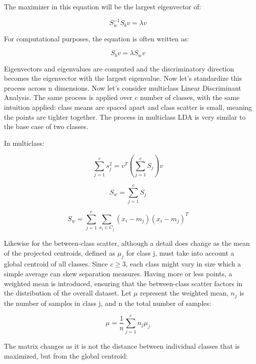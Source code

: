 \documentclass{article}
\begin{document}
The maximizer in this equation will be the largest eigenvector of:

\begin{equation*}
S_w^{-1} S_b v = \lambda v
\end{equation*}

For computational purposes, the equation is often written as:

\begin{equation*}
S_b v = \lambda S_w v
\end{equation*}

Eigenvectors and eigenvalues are computed and the discriminatory direction becomes the eigenvector with the largest eigenvalue. Now let's standardize this process across n dimensions. Now let's consider multiclass Linear Discriminant Analysis. The same process is applied over c number of classes, with the same intuition applied: class means are spaced apart and class scatter is small, meaning the points are tighter together. The process in multiclass LDA is very similar to the base case of two classes.

In multiclass:

\begin{equation*}
\sum_{j=1}^{c} s_j^2 = v^T \left(\sum_{j=1}^{c} S_j\right) v
\end{equation*}

\begin{equation*}
S_w = \sum_{j=1}^{c} S_j
\end{equation*}

\begin{equation*}
S_w = \sum_{j=1}^{c} \sum_{x_i \in C_j} (x_i - m_j)(x_i - m_j)^T
\end{equation*}

Likewise for the between-class scatter, although a detail does change as the mean of the projected centroids, defined as $\mu_j$ for class j, must take into account a global centroid of all classes. Since $c \geq 3$, each class might vary in size which a simple average can skew separation measures. Having more or less points, a weighted mean is introduced, ensuring that the between-class scatter factors in the distribution of the overall dataset. Let $\mu$ represent the weighted mean, $n_j$ is the number of samples in class j, and n the total number of samples:

\begin{equation*}
\mu = \frac{1}{n} \sum_{j=1}^{c} n_j \mu_j
\end{equation*}

The matrix changes as it is not the distance between individual classes that is maximized, but from the global centroid:
\end{document}
